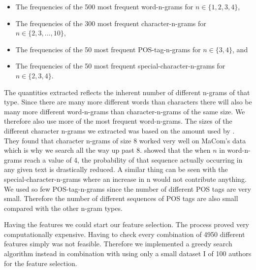 \begin{itemize}

    \item

        The frequencies of the 500 most frequent word-n-grams for $n \in \{1, 2,
        3, 4\}$,

    \item

        The frequencies of the 300 most frequent character-n-grams for $n \in
        \{2, 3, ..., 10\}$,

    \item

        The frequencies of the 50 most frequent \gls{POS}-tag-n-grams for $n \in
        \{3, 4\}$, and

    \item

        The frequencies of the 50 most frequent special-character-n-grams for $n
        \in \{2, 3, 4\}$.

\end{itemize}

The quantities extracted reflects the inherent number of different n-grams of
that type. Since there are many more different words than characters there will
also be many more different word-n-grams than character-n-grams of the same
size. We therefore also use more of the most frequent word-n-grams. The sizes
of the different character n-grams we extracted was based on the amount used by
\citet{aalykke2016}. They found that character n-grams of size 8 worked very
well on MaCom's data which is why we search all the way up past 8. \citet{US}
showed that the when $n$ in word-n-grams reach a value of 4, the probability of
that sequence actually occurring in any given text is drastically reduced. A
similar thing can be seen with the special-character-n-grams where an increase
in n would not contribute anything. We used so few \gls{POS}-tag-n-grams since
the number of different \gls{POS} tags are very small. Therefore the number of
different sequences of \gls{POS} tags are also small compared with the other
n-gram types.

Having the features we could start our feature selection. The process proved
very computationally expensive. Having to check every combination of 4950
different features simply was not feasible. Therefore we implemented a greedy
search algorithm instead in combination with using only a small dataset \gls{I}
of 100 authors for the feature selection.

